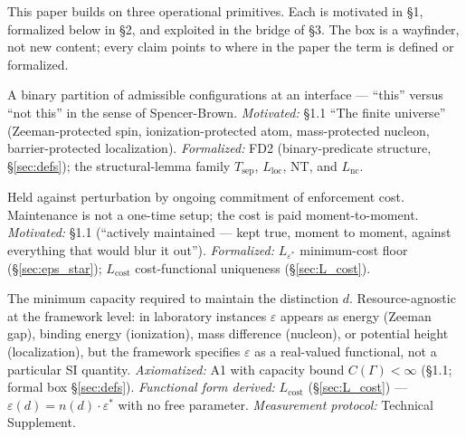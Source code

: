 \documentclass[11pt]{article}
\theoremstyle{remark}
\begin{document}
\begin{tcolorbox}[apfbox, title={Operational primitives: where each term is defined and formalized}]
This paper builds on three operational primitives.  Each is motivated in
\S 1, formalized below in \S 2, and exploited in the bridge of \S 3.
The box is a wayfinder, not new content; every claim points to where in
the paper the term is defined or formalized.

\begin{description}[topsep=2pt,itemsep=2pt]
  \item[Distinction.]  A binary partition of admissible configurations at
    an interface --- ``this'' versus ``not this'' in the sense of
    Spencer-Brown.  \emph{Motivated:} \S 1.1 ``The finite universe''
    (Zeeman-protected spin, ionization-protected atom, mass-protected
    nucleon, barrier-protected localization).  \emph{Formalized:} FD2
    (binary-predicate structure, \S\ref{sec:defs}); the structural-lemma
    family $T_{\mathrm{sep}}$, $L_{\mathrm{loc}}$, NT, and
    $L_{\mathrm{nc}}$.

  \item[Maintained.]  Held against perturbation by ongoing commitment of
    enforcement cost.  Maintenance is not a one-time setup; the cost is
    paid moment-to-moment.  \emph{Motivated:} \S 1.1 (``actively
    maintained --- kept true, moment to moment, against everything that
    would blur it out'').  \emph{Formalized:} $L_{\varepsilon^*}$
    minimum-cost floor (\S\ref{sec:eps_star}); $L_{\mathrm{cost}}$
    cost-functional uniqueness (\S\ref{sec:L_cost}).

  \item[Enforcement cost $\varepsilon(d)$.]  The minimum capacity required
    to maintain the distinction $d$.  Resource-agnostic at the framework
    level: in laboratory instances $\varepsilon$ appears as energy
    (Zeeman gap), binding energy (ionization), mass difference (nucleon),
    or potential height (localization), but the framework specifies
    $\varepsilon$ as a real-valued functional, not a particular SI quantity.
    \emph{Axiomatized:} A1 with capacity bound $C(\Gamma) < \infty$
    (\S 1.1; formal box \S\ref{sec:defs}).  \emph{Functional form derived:}
    $L_{\mathrm{cost}}$ (\S\ref{sec:L_cost}) ---
    $\varepsilon(d) = n(d)\cdot\varepsilon^*$ with no free parameter.
    \emph{Measurement protocol:} Technical Supplement.
\end{description}
\end{tcolorbox}
\end{document}
